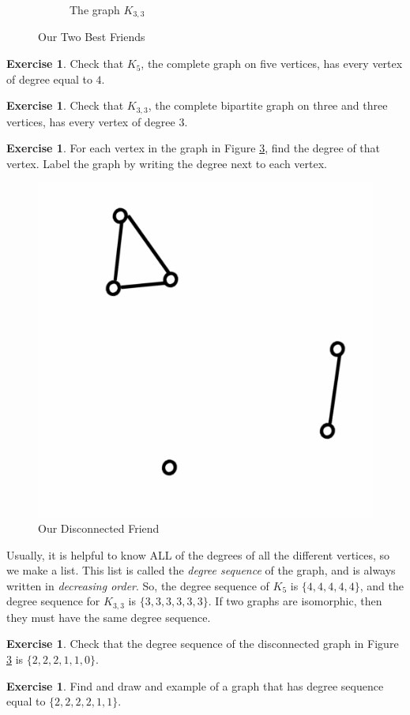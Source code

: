 \documentclass[12pt,letterpaper]{article}
\theoremstyle{definition}
\newtheorem{exercise}[question]{Exercise}
\begin{document}
\begin{figure}[h]
\begin{subfigure}[b]{.4\textwidth}
\caption{The graph $K_{3,3}$}
\label{figure:k33}
\end{subfigure}
\caption{Our Two Best Friends}
\label{figure:complete_graphs}
\end{figure}


\begin{exercise}
Check that $K_5$, the complete graph on five vertices, has every vertex of degree equal to $4$. 
\end{exercise}

\begin{exercise}
Check that $K_{3,3}$, the complete bipartite graph on three and three vertices, has every vertex of degree $3$.
\end{exercise}

\begin{exercise}
For each vertex in the graph in Figure \ref{figure:deg-ex}, find the degree of that vertex. Label the graph by writing the degree next to each vertex.
\end{exercise}

\begin{figure}[h]
\centering
\includegraphics[width=.3\textwidth]{images/disconnected.png}
\caption{Our Disconnected Friend}
\label{figure:deg-ex}
\end{figure}

Usually, it is helpful to know ALL of the degrees of all the different vertices, so we make a list. This list is called
the \emph{degree sequence} of the graph, and is always written in \textit{decreasing order}. So, the degree
sequence of $K_5$ is $\{4,4,4,4,4\}$, and the degree sequence for $K_{3,3}$ is $\{3,3,3,3,3,3\}$. 
If two graphs are isomorphic, then they must have the same degree sequence.

\begin{exercise}
Check that the degree sequence of the disconnected graph in Figure \ref{figure:deg-ex} is $\{2,2,2,1,1,0\}$.
\end{exercise}

\begin{exercise}
Find and draw and example of a graph that has degree sequence equal to $\{2,2,2,2,1,1\}$.
\end{exercise}
\end{document}
